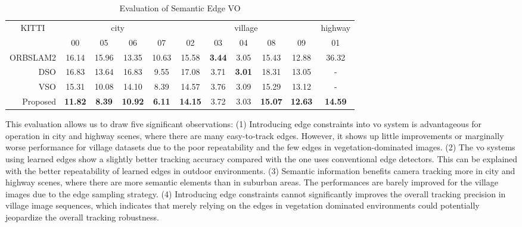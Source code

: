 \begin{table}
	\centering
	\caption[Evaluation of Semantic Edge VO]{ Evaluation of Semantic Edge VO
	\label{tbl:semantics_eval}}
	\begin{tabular}{rcccccccccc}
\hline
\multicolumn{1}{c}{\multirow{2}{*}{KITTI}} & \multicolumn{4}{c}{city} & \multicolumn{5}{c}{village}      & highway \\
\multicolumn{1}{c}{}               &     00            & 05              & 06               & 07            & 02               & 03             & 04            & 08              & 09              & 01      \\ \hline
ORBSLAM2                              &  16.14          & 15.96         & 13.35          & 10.63        & 15.58         & \textbf{3.44} & 3.05         &  15.43      & 12.88          &  36.32      \\
DSO                                        & 16.83           & 13.64         & 16.83          & 9.55          & 17.08         & 3.71 & \textbf{3.01} & 18.31     & 13.05          & -       \\
VSO                                        & 15.31           & 10.08         & 14.10          & 8.39          & 14.57         & 3.76          & 3.09          & 15.29      & 13.12          & -       \\
Proposed                                 & \textbf{11.82}  & \textbf{8.39}  & \textbf{10.92} & \textbf{6.11} & \textbf{14.15} & 3.72          & 3.03      & \textbf{15.07} & \textbf{12.63} & \textbf{14.59}   \\ \hline
	\end{tabular}                    
\end{table}

This evaluation allows us to draw five significant observations: 
(1) Introducing edge constraints into \acrshort{vo} system is advantageous for operation in city and highway scenes, where there are many easy-to-track edges.  
However, it shows up little improvements or marginally worse performance for village datasets due to the poor repeatability and the few edges in
vegetation-dominated images. 
(2) The \acrshort{vo} systems using learned edges show a slightly better tracking accuracy compared with the one uses conventional edge detectors. 
This can be explained with the better repeatability of learned edges
in outdoor environments. 
(3) Semantic information benefits camera tracking more in city and highway scenes, where there are more semantic elements than in suburban areas.  
The performances are barely improved for the village images due to the edge sampling strategy. 
(4) Introducing edge constraints cannot significantly improves the overall tracking precision in village image sequences, which indicates that merely relying on the edges in vegetation dominated environments could potentially jeopardize the overall tracking robustness. 

